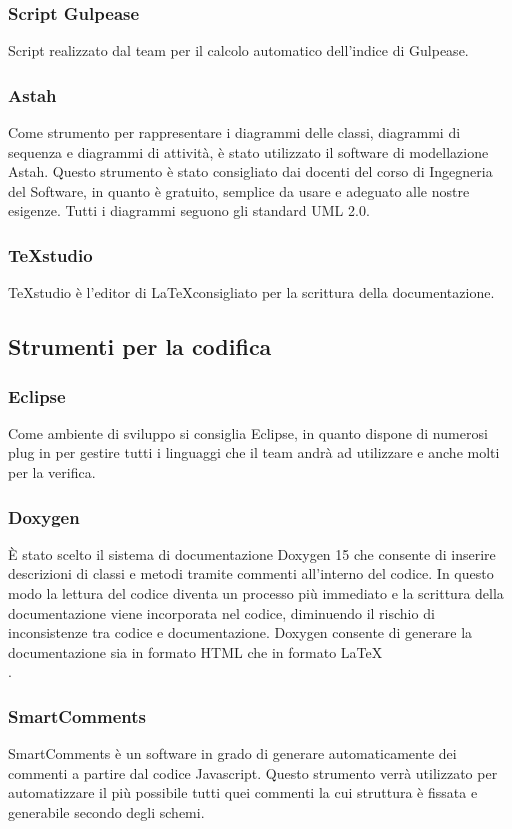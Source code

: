 \subsubsection{Script Gulpease}
\label{}
Script realizzato dal team per il calcolo automatico dell'indice di Gulpease.

\subsubsection{Astah}
Come strumento per rappresentare i diagrammi delle classi, diagrammi di sequenza e diagrammi di attività, è stato utilizzato il software di modellazione Astah. Questo strumento è stato consigliato dai docenti del corso di Ingegneria del Software, in quanto è gratuito, semplice da usare e adeguato alle nostre esigenze. Tutti i diagrammi seguono gli standard UML 2.0.

\subsubsection{TeXstudio}
TeXstudio è l'editor di \LaTeX consigliato per la scrittura della documentazione.

\subsection{Strumenti per la codifica}
\subsubsection{Eclipse}
Come ambiente di sviluppo si consiglia Eclipse, in quanto dispone di numerosi plug in per gestire tutti i linguaggi che il team andrà ad utilizzare e anche molti per la verifica.

\subsubsection{Doxygen}
È stato scelto il sistema di documentazione Doxygen 15 che consente di inserire descrizioni di classi e metodi tramite commenti all’interno del codice. In questo modo la lettura del codice diventa un processo più immediato e la scrittura della documentazione viene incorporata nel codice, diminuendo il rischio di inconsistenze tra codice e 
documentazione. Doxygen consente di generare la documentazione sia in formato HTML che in formato \LaTeX\\.

\subsubsection{SmartComments}
SmartComments è un software in grado di generare automaticamente dei commenti a partire dal codice Javascript.
Questo strumento verrà utilizzato per automatizzare il più possibile tutti quei commenti la cui struttura è fissata e generabile secondo degli schemi.


